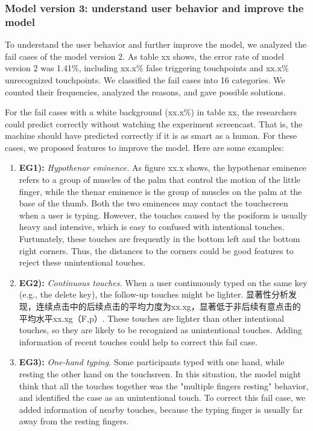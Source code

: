 \subsubsection{Model version 3: understand user behavior and  improve the model}

To understand the user behavior and further improve the model, we analyzed the fail cases of the model version 2. As table xx shows, the error rate of model version 2 was 1.41\%, including xx.x\% false triggering touchpoints and xx.x\% unrecognized touchpoints. We classified the fail cases into 16 categories. We counted their frequencies, analyzed the reasons, and gave possible solutions.

For the fail cases with a white background (xx.x\%) in table xx, the researchers could predict correctly without watching the experiment screencast. That is, the machine should have predicted correctly if it is as smart as a human. For these cases, we proposed features to improve the model. Here are some examples:


\begin{enumerate}
	\item{\textbf{EG1):} \emph{Hypothenar eminence.} As figure xx.x shows, the hypothenar eminence refers to a group of muscles of the palm that control the motion of the little finger, while the thenar eminence is the group of muscles on the palm at the base of the thumb. Both the two eminences may contact the touchscreen when a user is typing. However, the touches caused by the posiform is usually heavy and intensive, which is easy to confused with intentional touches. Furtunately, these touches are frequently in the bottom left and the bottom right corners. Thus, the distances to the corners could be good features to reject these unintentional touches.}
	\item{\textbf{EG2):} \emph{Continuous touches.} When a user continuously typed on the same key (e.g., the delete key), the follow-up touches might be lighter. 显著性分析发现，连续点击中的后续点击的平均力度为xx.xg，显著低于非后续有意点击的平均水平xx.xg（F,p）. These touches are lighter than other intentional touches, so they are likely to be recognized as unintentional touches. Adding information of recent touches could help to correct this fail case.}
	\item{\textbf{EG3):} \emph{One-hand typing.} Some participants typed with one hand, while resting the other hand on the touchsreen. In this situation, the model might think that all the touches together was the "multiple fingers resting" behavior, and identified the case as an unintentional touch. To correct this fail case, we added information of nearby touches, because the typing finger is usually far away from the resting fingers.}
\end{enumerate}

